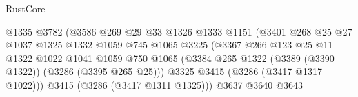 \begin{lexlean}{RustCore}
\begin{coremodule}
                                                @1335
                                                @3782
                                                (@3586
                                                  @269
                                                  @29
                                                  @33
                                                  @1326
                                                  @1333
                                                  @1151
                                                  (@3401
                                                    @268
                                                    @25
                                                    @27
                                                    @1037
                                                    @1325
                                                    @1332
                                                    @1059
                                                    @745
                                                    @1065
                                                    @3225
                                                    (@3367
                                                      @266
                                                      @123
                                                      @25
                                                      @11
                                                      @1322
                                                      @1022
                                                      @1041
                                                      @1059
                                                      @750
                                                      @1065
                                                      (@3384
                                                        @265
                                                        @1322
                                                        (@3389 (@3390 @1322))
                                                        (@3286 (@3395 @265 @25)))
                                                      @3325
                                                      @3415
                                                      (@3286 (@3417 @1317 @1022)))
                                                    @3415
                                                    (@3286 (@3417 @1311 @1325)))
                                                  @3637
                                                  @3640
                                                  @3643

\end{coremodule}
\end{lexlean}
